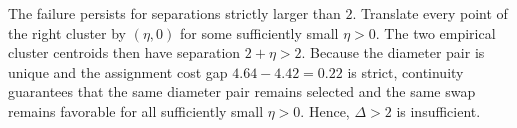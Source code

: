 \documentclass{article}
\theoremstyle{plain}
\theoremstyle{definition}
\newcommand{\1}{\mathbf{1}}
\begin{document}
The failure persists for separations strictly larger than $2$.
Translate every point of the right cluster by $(\eta,0)$ for some sufficiently small $\eta>0$.
The two empirical cluster centroids then have separation $2+\eta>2$.
Because the diameter pair is unique and the assignment cost gap $4.64-4.42=0.22$ is strict, continuity guarantees that the same diameter pair remains selected and the same swap remains favorable for all sufficiently small $\eta>0$.
Hence, $\Delta>2$ is insufficient.

\begingroup
\raggedright

\endgroup
\end{document}
